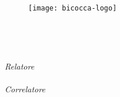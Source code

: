 \begin{titlepage}
    \begin{center}
        \begin{LARGE}
            \textbf{\myUni}\\
        \end{LARGE}

        \vspace{10pt}

        \begin{large}
            \textsc{\myDepartment}\\
        \end{large}

        \vspace{10pt}

        \begin{Large}
            \textsc{\myFaculty}\\
        \end{Large}

        \vspace{30pt}
        \begin{figure}[htbp]
            \centering
            \texttt{[image: bicocca-logo]}
        \end{figure}
        \vspace{30pt}

        \begin{LARGE}
            \textbf{\myTitle}\\
        \end{LARGE}

        \vspace{10pt}

        \begin{large}
            \textsl{\myDegree}\\
        \end{large}

        \vspace{60pt}

        \begin{large}
            \begin{flushleft}
                \textit{Relatore}\\
                \profTitle\ \myProf
                \vspace{10pt} \\
                \textit{Correlatore}\\
                \profTitle\ \coProf\\
            \end{flushleft}


\end{large}
\end{center}
\end{titlepage}
